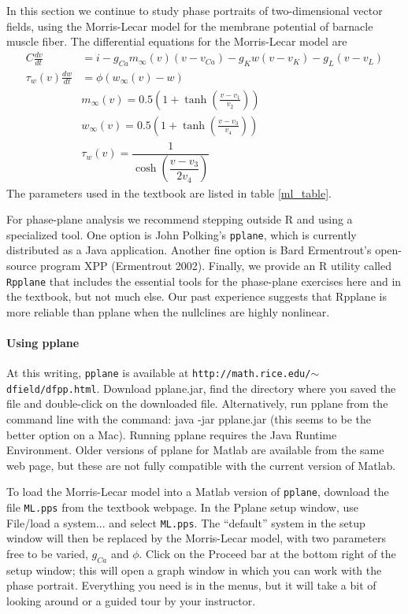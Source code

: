 \documentclass [11pt]{article}
\newcommand{\ttt}[1]{\texttt{#1}}
\newcounter{exercise}
\numberwithin{exercise}{section}
\def\R{R }
\begin{document}
In this section we continue to study phase portraits of two-dimensional vector fields,
using the Morris-Lecar model for the membrane potential of barnacle muscle fiber. 
The differential equations for the Morris-Lecar model are 
\begin{equation}
\begin{aligned}
C\frac{dv}{dt} & = i - g_{Ca} m_\infty(v)(v-v_{Ca}) - g_K w(v-v_K) - g_L (v-v_L) \\
\tau_w(v) \frac{dw}{dt} & = \phi (w_\infty(v) - w) \\
& m_\infty(v) = 0.5 \left(1+ \tanh(\frac{v-v_1}{v_2})\right) \\
& w_\infty(v) = 0.5\left(1+ \tanh(\frac{v-v_3}{v_4})\right) \\
& \tau_w(v) = \dfrac{1}{\cosh\left(\dfrac{v-v_3}{2v_4}\right)}
\end{aligned} 
\end{equation}
The parameters used in the textbook are listed in table \ref{ml_table}.

For phase-plane analysis we recommend stepping outside \R and 
using a specialized tool. One option is  John Polking's \ttt{pplane}, which is currently distributed as a Java application. Another fine option is Bard Ermentrout's
open-source program XPP (Ermentrout 2002). Finally, we provide an \R utility called \ttt{Rpplane} that 
includes the essential tools for the phase-plane exercises here and in the textbook, but not much else. 
Our past experience suggests that Rpplane is more reliable than pplane when the nullclines are highly nonlinear.  

\paragraph{Using pplane} At this writing, \texttt{pplane} is available at 
 \texttt{http://math.rice.edu/$\sim$dfield/dfpp.html}. Download pplane.jar, 
 find the directory where you saved the file and double-click on the downloaded file. 
 Alternatively, run pplane from the command line with the command: java -jar pplane.jar (this seems to be the
 better option on a Mac). Running pplane requires the Java Runtime Environment. Older versions
 of pplane for Matlab are available from the same web page, but these are not fully compatible
 with the current version of Matlab. 

To load the Morris-Lecar model into a Matlab version of \ttt{pplane}, download the 
file \ttt{ML.pps} from the textbook webpage. In the Pplane setup window, 
use File/load a system... and select \ttt{ML.pps}. The ``default'' system in the setup window
will then be replaced by the Morris-Lecar model, with two parameters free to be varied, $g_{Ca}$ and $\phi$. 
Click on the Proceed bar at the bottom right of the setup window; this will open a graph window
in which you can work with the phase portrait. Everything you need is in the menus, but it will take
a bit of looking around or a guided tour by your instructor. 
\end{document}
